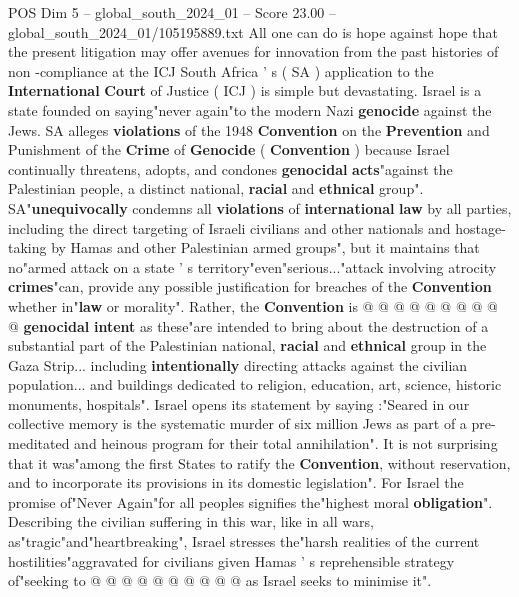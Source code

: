 \begin{textsample}{POS Dim 5 – global\_south\_2024\_01 – Score 23.00 – global\_south\_2024\_01/105195889.txt}  \label{ex:f5_pos_005}
All one can do is hope against hope that the present litigation may offer avenues for innovation from the past histories of non -compliance at the ICJ South Africa ' s ( SA ) application to the \textbf{International} \textbf{Court} of Justice ( ICJ ) is simple but devastating.
Israel is a state founded on saying"never again"to the modern Nazi \textbf{genocide} against the Jews.
SA alleges \textbf{violations} of the 1948 \textbf{Convention} on the \textbf{Prevention} and Punishment of the \textbf{Crime} of \textbf{Genocide} ( \textbf{Convention} ) because Israel continually threatens, adopts, and condones \textbf{genocidal} \textbf{acts}"against the Palestinian people, a distinct national, \textbf{racial} and \textbf{ethnical} group".
SA"\textbf{unequivocally} condemns all \textbf{violations} of \textbf{international} \textbf{law} by all parties, including the direct targeting of Israeli civilians and other nationals and hostage-taking by Hamas and other Palestinian armed groups", but it maintains that no"armed attack on a state ' s territory"even"serious..."attack involving atrocity \textbf{crimes}"can, provide any possible justification for breaches of the \textbf{Convention} whether in"\textbf{law} or morality".
Rather, the \textbf{Convention} is @ @ @ @ @ @ @ @ @ @ \textbf{genocidal} \textbf{intent} as these"are intended to bring about the destruction of a substantial part of the Palestinian national, \textbf{racial} and \textbf{ethnical} group in the Gaza Strip... including \textbf{intentionally} directing attacks against the civilian population... and buildings dedicated to religion, education, art, science, historic monuments, hospitals".
Israel opens its statement by saying :"Seared in our collective memory is the systematic murder of six million Jews as part of a pre-meditated and heinous program for their total annihilation".
It is not surprising that it was"among the first States to ratify the \textbf{Convention}, without reservation, and to incorporate its provisions in its domestic legislation".
For Israel the promise of"Never Again"for all peoples signifies the"highest moral \textbf{obligation}".
Describing the civilian suffering in this war, like in all wars, as"tragic"and"heartbreaking", Israel stresses the"harsh realities of the current hostilities"aggravated for civilians given Hamas ' s reprehensible strategy of"seeking to @ @ @ @ @ @ @ @ @ @ as Israel seeks to minimise it".

\end{textsample}
